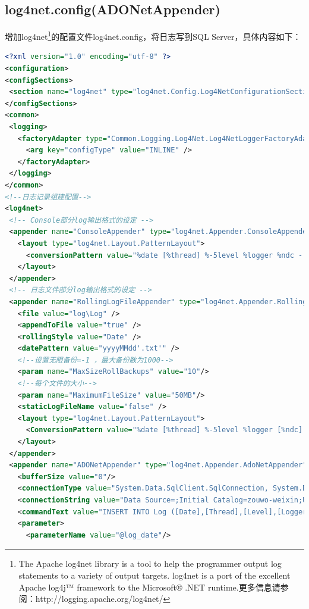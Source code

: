 \documentclass{book}
\begin{document}
\subsection{log4net.config(ADONetAppender)}

增加log4net\footnote{The Apache log4net library is a tool to help the programmer output log statements to a variety of output targets. log4net is a port of the excellent Apache log4j™ framework to the Microsoft® .NET runtime.更多信息请参阅：http://logging.apache.org/log4net/}的配置文件log4net.config，将日志写到SQL Server，具体内容如下：

\begin{lstlisting}[language=XML]
<?xml version="1.0" encoding="utf-8" ?>
<configuration>
<configSections> 
 <section name="log4net" type="log4net.Config.Log4NetConfigurationSectionHandler, log4net" />
</configSections>
<common>
 <logging>
   <factoryAdapter type="Common.Logging.Log4Net.Log4NetLoggerFactoryAdapter, Common.Logging.Log4net">
     <arg key="configType" value="INLINE" />
   </factoryAdapter>
 </logging>
</common>
<!--日志记录组建配置-->
<log4net>
 <!-- Console部分log输出格式的设定 -->
 <appender name="ConsoleAppender" type="log4net.Appender.ConsoleAppender">
   <layout type="log4net.Layout.PatternLayout">
     <conversionPattern value="%date [%thread] %-5level %logger %ndc - %message%newline" />
   </layout>
 </appender>
 <!-- 日志文件部分log输出格式的设定 -->
 <appender name="RollingLogFileAppender" type="log4net.Appender.RollingFileAppender">
   <file value="log\Log" />
   <appendToFile value="true" />
   <rollingStyle value="Date" />
   <datePattern value="yyyyMMdd'.txt'" />
   <!--设置无限备份=-1 ，最大备份数为1000-->
   <param name="MaxSizeRollBackups" value="10"/>
   <!--每个文件的大小-->
   <param name="MaximumFileSize" value="50MB"/>   
   <staticLogFileName value="false" />
   <layout type="log4net.Layout.PatternLayout">        
     <ConversionPattern value="%date [%thread] %-5level %logger [%ndc] - %message%newline" />
   </layout>
 </appender>
 <appender name="ADONetAppender" type="log4net.Appender.AdoNetAppender">
   <bufferSize value="0"/>
   <connectionType value="System.Data.SqlClient.SqlConnection, System.Data, Version=1.0.3300.0, Culture=neutral, PublicKeyToken=b77a5c561934e089"/>
   <connectionString value="Data Source=;Initial Catalog=zouwo-weixin;User ID=;Password="/>
   <commandText value="INSERT INTO Log ([Date],[Thread],[Level],[Logger],[Message],[Exception]) VALUES (@log_date, @thread, @log_level, @logger, @message, @exception)"/>
   <parameter>
     <parameterName value="@log_date"/>

\end{lstlisting}
\end{document}
